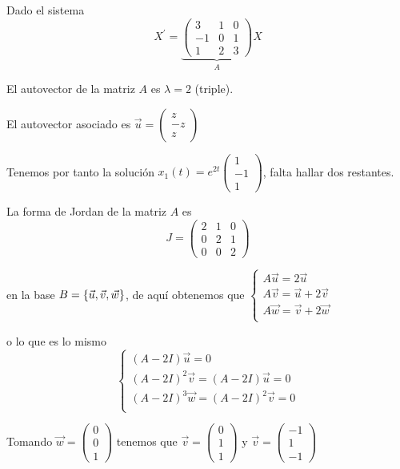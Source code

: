 \begin{example}
Dado el sistema $$X^\prime = \underbrace{\begin{pmatrix}
3 & 1 & 0\\-1 & 0 & 1\\1 & 2 & 3
\end{pmatrix}}_AX$$

El autovector de la matriz $A$ es $\lambda = 2$ (triple).

El autovector asociado es $\vec{u} = \begin{pmatrix}
z\\-z\\z
\end{pmatrix}$

Tenemos por tanto la solución $x_1(t) = e^{2t}\begin{pmatrix}
1\\ -1\\ 1
\end{pmatrix}$, falta hallar dos restantes.

La forma de Jordan de la matriz $A$ es $$J = \begin{pmatrix}
2& 1& 0\\ 0& 2& 1\\ 0& 0& 2
\end{pmatrix}$$

en la base $B = \{ \vec{u}, \vec{v}, \vec{w} \}$, de aquí obtenemos que $\left\lbrace
  \begin{array}{l}
     A\vec{u} = 2\vec{u}\\
     A\vec{v} = \vec{u} + 2\vec{v}\\
     A\vec{w} = \vec{v} + 2\vec{w}\\
  \end{array}
  \right.
$

o lo que es lo mismo $$\left\lbrace
  \begin{array}{l}
     (A-2I)\vec{u} = 0\\
     (A-2I)^2\vec{v} = (A-2I)\vec{u} = 0\\
     (A-2I)^3\vec{w} = (A-2I)^2\vec{v} = 0\\
  \end{array}
  \right.$$

Tomando $\vec{w} = \begin{pmatrix}
0\\0\\1
\end{pmatrix}$ tenemos que $\vec{v} = \begin{pmatrix}
0\\1\\1
\end{pmatrix}$ y $\vec{v} = \begin{pmatrix}
-1\\1\\-1
\end{pmatrix}$


\end{example}
